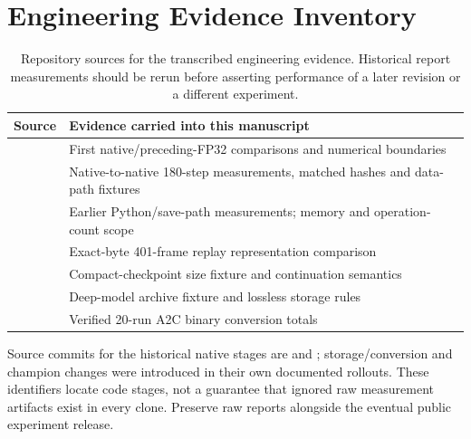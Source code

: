 \section{Engineering Evidence Inventory}\label{app:evidence}
\begin{table}[ht]
\centering\small
\caption{Repository sources for the transcribed engineering evidence. Historical
report measurements should be rerun before asserting performance of a later
revision or a different experiment.}
\begin{tabularx}{\linewidth}{@{}lY@{}}\toprule
Source & Evidence carried into this manuscript\\\midrule
{} & First native/preceding-FP32 comparisons and numerical boundaries\\
 & Native-to-native 180-step measurements, matched hashes and data-path fixtures\\
 & Earlier Python/save-path measurements; memory and operation-count scope\\
 & Exact-byte 401-frame replay representation comparison\\
 & Compact-checkpoint size fixture and continuation semantics\\
 & Deep-model archive fixture and lossless storage rules\\
 & Verified 20-run A2C binary conversion totals\\\bottomrule
\end{tabularx}
\end{table}

Source commits for the historical native stages are  and
; storage/conversion and champion changes were introduced in their
own documented rollouts. These identifiers locate code stages, not a guarantee
that ignored raw measurement artifacts exist in every clone. Preserve raw reports
alongside the eventual public experiment release.
